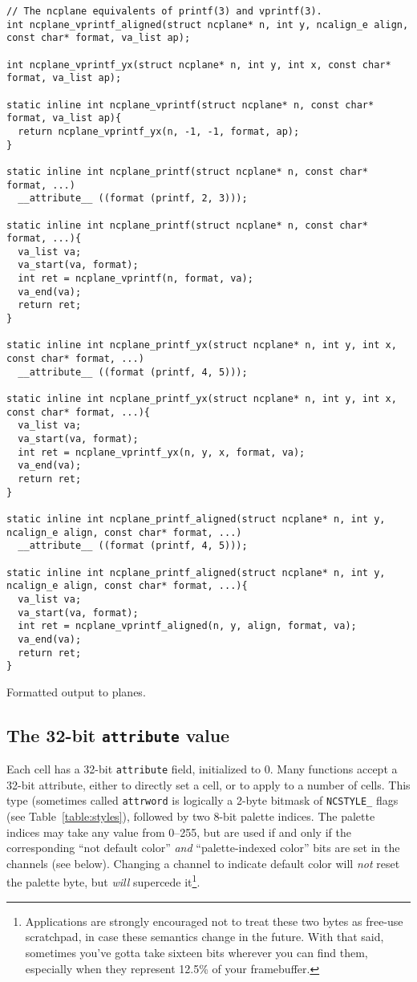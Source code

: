 \begin{listing}[!htb]
\begin{verbatim}
// The ncplane equivalents of printf(3) and vprintf(3).
int ncplane_vprintf_aligned(struct ncplane* n, int y, ncalign_e align, const char* format, va_list ap);

int ncplane_vprintf_yx(struct ncplane* n, int y, int x, const char* format, va_list ap);

static inline int ncplane_vprintf(struct ncplane* n, const char* format, va_list ap){
  return ncplane_vprintf_yx(n, -1, -1, format, ap);
}

static inline int ncplane_printf(struct ncplane* n, const char* format, ...)
  __attribute__ ((format (printf, 2, 3)));

static inline int ncplane_printf(struct ncplane* n, const char* format, ...){
  va_list va;
  va_start(va, format);
  int ret = ncplane_vprintf(n, format, va);
  va_end(va);
  return ret;
}

static inline int ncplane_printf_yx(struct ncplane* n, int y, int x, const char* format, ...)
  __attribute__ ((format (printf, 4, 5)));

static inline int ncplane_printf_yx(struct ncplane* n, int y, int x, const char* format, ...){
  va_list va;
  va_start(va, format);
  int ret = ncplane_vprintf_yx(n, y, x, format, va);
  va_end(va);
  return ret;
}

static inline int ncplane_printf_aligned(struct ncplane* n, int y, ncalign_e align, const char* format, ...)
  __attribute__ ((format (printf, 4, 5)));

static inline int ncplane_printf_aligned(struct ncplane* n, int y, ncalign_e align, const char* format, ...){
  va_list va;
  va_start(va, format);
  int ret = ncplane_vprintf_aligned(n, y, align, format, va);
  va_end(va);
  return ret;
}
\end{verbatim}
\caption{Formatted output to planes.}
\label{list:printf}
\end{listing}

\subsection{The 32-bit \texttt{attribute} value}
\label{sec:attribute}
Each cell has a 32-bit \texttt{attribute} field, initialized to 0. Many functions
accept a 32-bit attribute, either to directly set a cell, or to apply to a number
of cells. This type (sometimes called \texttt{attrword} is logically a 2-byte
bitmask of \texttt{NCSTYLE\_} flags (see Table~\ref{table:styles}), followed by two 8-bit palette indices. The
palette indices may take any value from 0--255, but are used if and only if the
corresponding ``not default color'' \textit{and} ``palette-indexed color'' bits
are set in the channels (see below). Changing a channel to indicate default color
will \textit{not} reset the palette byte, but \textit{will} supercede
it\footnote{Applications are strongly encouraged not to treat these two bytes as free-use scratchpad, in
case these semantics change in the future. With that said, sometimes you've gotta
take sixteen bits wherever you can find them, especially when they represent 12.5\%
of your framebuffer.}.

